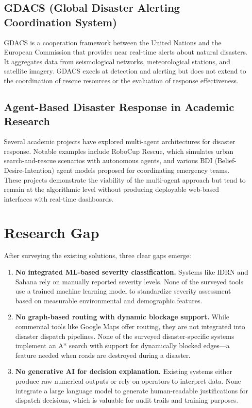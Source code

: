 \subsection{GDACS (Global Disaster Alerting Coordination System)}

GDACS is a cooperation framework between the United Nations and the European Commission that provides near real-time alerts about natural disasters. It aggregates data from seismological networks, meteorological stations, and satellite imagery. GDACS excels at detection and alerting but does not extend to the coordination of rescue resources or the evaluation of response effectiveness.

\subsection{Agent-Based Disaster Response in Academic Research}

Several academic projects have explored multi-agent architectures for disaster response. Notable examples include RoboCup Rescue, which simulates urban search-and-rescue scenarios with autonomous agents, and various BDI (Belief-Desire-Intention) agent models proposed for coordinating emergency teams. These projects demonstrate the viability of the multi-agent approach but tend to remain at the algorithmic level without producing deployable web-based interfaces with real-time dashboards.

\section{Research Gap}
\label{sec:research_gap}

After surveying the existing solutions, three clear gaps emerge:

\begin{enumerate}[leftmargin=*]
    \item \textbf{No integrated ML-based severity classification.} Systems like IDRN and Sahana rely on manually reported severity levels. None of the surveyed tools use a trained machine learning model to standardize severity assessment based on measurable environmental and demographic features.

    \item \textbf{No graph-based routing with dynamic blockage support.} While commercial tools like Google Maps offer routing, they are not integrated into disaster dispatch pipelines. None of the surveyed disaster-specific systems implement an A* search with support for dynamically blocked edges---a feature needed when roads are destroyed during a disaster.

    \item \textbf{No generative AI for decision explanation.} Existing systems either produce raw numerical outputs or rely on operators to interpret data. None integrate a large language model to generate human-readable justifications for dispatch decisions, which is valuable for audit trails and training purposes.
\end{enumerate}


